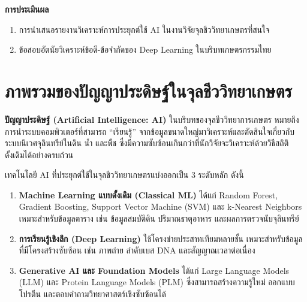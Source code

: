 \noindent\textbf{การประเมินผล}
\begin{enumerate}
    \item การนำเสนอรายงานวิเคราะห์การประยุกต์ใช้ AI ในงานวิจัยจุลชีววิทยาเกษตรที่สนใจ
    \item ข้อสอบอัตนัยวิเคราะห์ข้อดี-ข้อจำกัดของ Deep Learning ในบริบทเกษตรกรรมไทย
\end{enumerate}

\newpage


\section{ภาพรวมของปัญญาประดิษฐ์ในจุลชีววิทยาเกษตร}

\textbf{ปัญญาประดิษฐ์ (Artificial Intelligence: AI)} ในบริบทของจุลชีววิทยาการเกษตร หมายถึงการนำระบบคอมพิวเตอร์ที่สามารถ ``เรียนรู้'' จากข้อมูลขนาดใหญ่มาวิเคราะห์และตัดสินใจเกี่ยวกับระบบนิเวศจุลินทรีย์ในดิน น้ำ และพืช ซึ่งมีความซับซ้อนเกินกว่าที่นักวิจัยจะวิเคราะห์ด้วยวิธีสถิติดั้งเดิมได้อย่างครบถ้วน

เทคโนโลยี AI ที่ประยุกต์ใช้ในจุลชีววิทยาเกษตรแบ่งออกเป็น 3 ระดับหลัก ดังนี้
\begin{enumerate}
    \item \textbf{Machine Learning แบบดั้งเดิม (Classical ML)} ได้แก่ Random Forest, Gradient Boosting, Support Vector Machine (SVM) และ k-Nearest Neighbors เหมาะสำหรับข้อมูลตาราง เช่น ข้อมูลสมบัติดิน ปริมาณธาตุอาหาร และผลการตรวจนับจุลินทรีย์
    \item \textbf{การเรียนรู้เชิงลึก (Deep Learning)} ใช้โครงข่ายประสาทเทียมหลายชั้น เหมาะสำหรับข้อมูลที่มีโครงสร้างซับซ้อน เช่น ภาพถ่าย ลำดับเบส DNA และสัญญาณเวลาต่อเนื่อง
    \item \textbf{Generative AI และ Foundation Models} ได้แก่ Large Language Models (LLM) และ Protein Language Models (PLM) ซึ่งสามารถสร้างความรู้ใหม่ ออกแบบโปรตีน และตอบคำถามวิทยาศาสตร์เชิงซับซ้อนได้
\end{enumerate}

